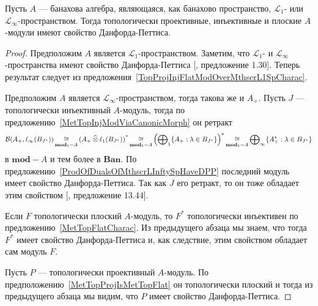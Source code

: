 \begin{theorem}\label{TopProjInjFlatModOverMthscrL1OrLInftySpHaveDPP} Пусть $A$
--- банахова алгебра, являющаяся, как банахово пространство, $\mathscr{L}_1$-
или $\mathscr{L}_\infty$-пространством. Тогда топологически проективные,
инъективные и плоские $A$-модули имеют свойство Данфорда-Петтиса.
\end{theorem}
\begin{proof} Предположим $A$ является $\mathscr{L}_1$-пространством. Заметим,
что $\mathscr{L}_1$- и $\mathscr{L}_\infty$-пространства имеют свойство
Данфорда-Петтиса [\cite{BourgNewClOfLpSp}, предложение 1.30]. Теперь результат
следует из предложения~\ref{TopProjInjFlatModOverMthscrL1SpCharac}.

Предположим $A$ является $\mathscr{L}_\infty$-пространством, тогда такова же и
$A_+$. Пусть $J$ --- топологически инъективный $A$-модуль, тогда по
предложению~\ref{MetTopInjModViaCanonicMorph} он ретракт
$$
\mathcal{B}(A_+,\ell_\infty(B_{J^*}))
\mathop{\mathbin{\cong}}\limits_{\mathbf{mod}_1-A}{(A_+\mathbin{\widehat{\otimes}}\ell_1(B_{J^*}))}^*
\mathop{\mathbin{\cong}}\limits_{\mathbf{mod}_1-A}
{\left(\bigoplus\nolimits_1 \{ A_+:\lambda\in B_{J^*} \}\right)}^*
\mathop{\mathbin{\cong}}\limits_{\mathbf{mod}_1-A}
\bigoplus\nolimits_\infty \{ A_+^*:\lambda\in B_{J^*} \}
$$ 
в $\mathbf{mod}-A$ и тем более в $\mathbf{Ban}$. По
предложению~\ref{ProdOfDualsOfMthscrLInftySpHaveDPP} последний модуль имеет
свойство Данфорда-Петтиса. Так как $J$ его ретракт, то он тоже обладает этим
свойством [\cite{FabHabBanSpTh}, предложение 13.44]. 

Если $F$ топологически плоский $A$-модуль, то $F^*$ топологически инъективен по
предложению~\ref{MetTopFlatCharac}. Из предыдущего абзаца мы знаем, что тогда
$F^*$ имеет свойство Данфорда-Петтиса и, как следствие, этим свойством обладает
сам модуль $F$.

Пусть $P$ --- топологически проективный $A$-модуль. По
предположению~\ref{MetTopProjIsMetTopFlat} он топологически плоский и тогда из
предыдущего абзаца мы видим, что $P$ имеет свойство Данфорда-Петтиса.
\end{proof}

